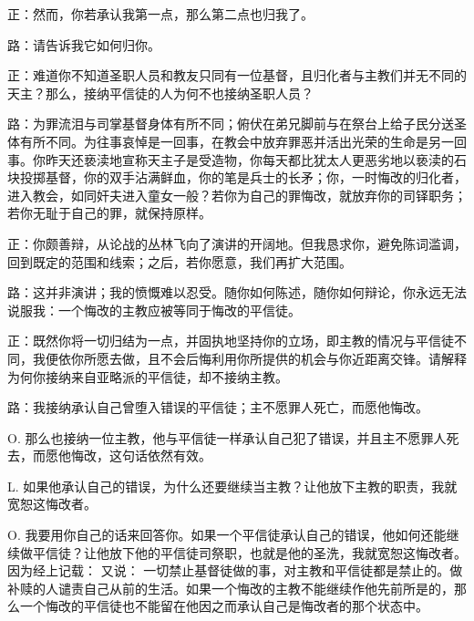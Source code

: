正：然而，你若承认我第一点，那么第二点也归我了。\par

路：请告诉我它如何归你。\par

正：难道你不知道圣职人员和教友只同有一位基督，且归化者与主教们并无不同的天主？那么，接纳平信徒的人为何不也接纳圣职人员？\par

路：为罪流泪与司掌基督身体有所不同；俯伏在弟兄脚前与在祭台上给子民分送圣体有所不同。为往事哀悼是一回事，在教会中放弃罪恶并活出光荣的生命是另一回事。你昨天还亵渎地宣称天主子是受造物，你每天都比犹太人更恶劣地以亵渎的石块投掷基督，你的双手沾满鲜血，你的笔是兵士的长矛；你，一时悔改的归化者，进入教会，如同奸夫进入童女一般？若你为自己的罪悔改，就放弃你的司铎职务；若你无耻于自己的罪，就保持原样。\par

正：你颇善辩，从论战的丛林飞向了演讲的开阔地。但我恳求你，避免陈词滥调，回到既定的范围和线索；之后，若你愿意，我们再扩大范围。\par

路：这并非演讲；我的愤慨难以忍受。随你如何陈述，随你如何辩论，你永远无法说服我：一个悔改的主教应被等同于悔改的平信徒。\par

正：既然你将一切归结为一点，并固执地坚持你的立场，即主教的情况与平信徒不同，我便依你所愿去做，且不会后悔利用你所提供的机会与你近距离交锋。请解释为何你接纳来自亚略派的平信徒，却不接纳主教。\par

路：我接纳承认自己曾堕入错误的平信徒；主不愿罪人死亡，而愿他悔改。\par

O. 那么也接纳一位主教，他与平信徒一样承认自己犯了错误，并且主不愿罪人死去，而愿他悔改，这句话依然有效。\par

L. 如果他承认自己的错误，为什么还要继续当主教？让他放下主教的职责，我就宽恕这悔改者。\par

O. 我要用你自己的话来回答你。如果一个平信徒承认自己的错误，他如何还能继续做平信徒？让他放下他的平信徒司祭职，也就是他的圣洗，我就宽恕这悔改者。因为经上记载：  又说：  一切禁止基督徒做的事，对主教和平信徒都是禁止的。做补赎的人谴责自己从前的生活。如果一个悔改的主教不能继续作他先前所是的，那么一个悔改的平信徒也不能留在他因之而承认自己是悔改者的那个状态中。\par

